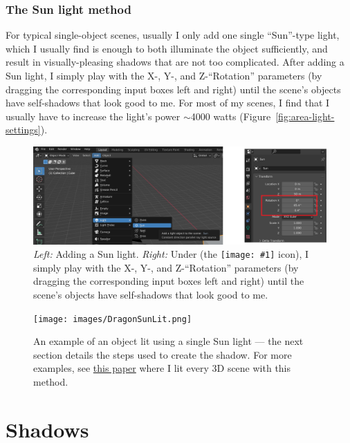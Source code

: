 \documentclass[10pt]{article}
\DeclareRobustCommand{\inlinepic}[1]{%
  \begingroup\normalfont
  \texttt{[image: \#1]}%
  \endgroup
}
\begin{document}
\subsubsection{The Sun light method}
\label{sec:TheSunLightMethod}
For typical single-object scenes, usually I only add one single ``Sun''-type light, which I usually find is enough to both illuminate the object sufficiently, and result in visually-pleasing shadows that are not too complicated. After adding a Sun light, I simply play with the X-, Y-, and Z-``Rotation'' parameters (by dragging the corresponding input boxes left and right) until the scene's objects have self-shadows that look good to me. For most of my scenes, I find that I usually have to increase the light's power $\sim$4000 watts (Figure~\ref{fig:area-light-settings}).

\begin{figure}[H]
    \centering
    \captionsetup{width=0.8\textwidth}
    \includegraphics[width=6in]{images/SunLightRotations.png}
    \caption{\textit{Left:} Adding a Sun light. \textit{Right:} Under  (the \inlinepic{images/object-properties-icon.png} icon), I simply play with the X-, Y-, and Z-``Rotation'' parameters (by dragging the corresponding input boxes left and right) until the scene's objects have self-shadows that look good to me. \label{fig:SunLightRotations}}
\end{figure}

\begin{figure}[H]
    \centering
    \captionsetup{width=0.8\textwidth}
    \texttt{[image: images/DragonSunLit.png]}
    \caption{An example of an object lit using a single Sun light --- the next section details the steps used to create the shadow. For more examples, see \href{}{this paper} where I lit every 3D scene with this method. \label{fig:BlockSunLit}}
\end{figure}


\section{Shadows}
\label{sec:Shadows}
\end{document}
